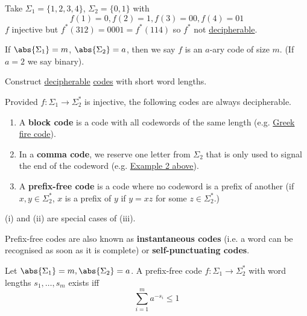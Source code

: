 \documentclass{article}
\begin{document}

\begin{eg}
    Take $\Sigma_1 = \{1, 2, 3, 4\}$, $\Sigma_2 = \{0, 1\}$ with
    \begin{equation*}
        f(1) = 0, f(2) = 1, f(3) = 00, f(4) = 01
    \end{equation*}
    $f$ injective but $f^*(312) = 0001 = f^*(114)$ so $f^*$ not \hyperlink{def:decipherable}{decipherable}.
\end{eg}

\begin{notation}
    If $\abs{\Sigma_1} = m$, $\abs{\Sigma_2} = a$, then we say $f$ is an $a$-ary code of size $m$. (If $a=2$ we say binary).
\end{notation}
\begin{aim}
    Construct \hyperlink{def:decipherable}{decipherable} \hyperlink{def:code}{codes} with short word lengths.
\end{aim}

Provided $f: \Sigma_1 \to \Sigma_2^*$ is injective, the following codes are always decipherable.
\begin{enumerate}[label=(\roman*)]
    \item A \textbf{block code} is a code with all codewords of the same length (e.g. \hyperlink{eg:greekFire}{Greek fire code}).
    \item In a \textbf{comma code}, we reserve one letter from $\Sigma_2$ that is only used to signal the end of the codeword (e.g. \hyperlink{ex:comma-code}{Example 2 above}).
    \item A \hypertarget{def:prefixFreeCode}{\textbf{prefix-free code}} is a code where no codeword is a prefix of another (if $x, y \in \Sigma_2^*$, $x$ is a prefix of $y$ if $y=xz$ for some $z \in \Sigma_2^*$.)
\end{enumerate}

\begin{remark}(i) and (ii) are special cases of (iii).
\end{remark}

Prefix-free codes are also known as \textbf{instantaneous codes} (i.e. a word can be recognised as soon as it is complete) or \textbf{self-punctuating codes}.

\begin{nthm}\label{thm:kraft}
    Let $\abs{\Sigma_1} = m, \abs{\Sigma_2} = a$. A prefix-free code $f: \Sigma_1 \to \Sigma_2^*$ with word lengths $s_1, \dotsc, s_m$ exists iff
    \begin{equation*}
        \sum_{i = 1}^m a^{-s_i} \leq 1
    \end{equation*}
\end{nthm}
\end{document}
